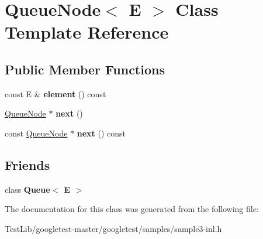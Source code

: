 \hypertarget{classQueueNode}{}\section{Queue\+Node$<$ E $>$ Class Template Reference}
\label{classQueueNode}
\subsection*{Public Member Functions}
\begin{DoxyCompactItemize}
\item 
\mbox{\label{classQueueNode_a1c61b3ed32e089f5901b87022ef84985}} 
const E \& {\bfseries element} () const
\item 
\mbox{\label{classQueueNode_a8a9fdf488da06533360999ef85db56ea}} 
\hyperlink{classQueueNode}{Queue\+Node} $\ast$ {\bfseries next} ()
\item 
\mbox{\label{classQueueNode_ada477e4f309f29383112dbda473dd985}} 
const \hyperlink{classQueueNode}{Queue\+Node} $\ast$ {\bfseries next} () const
\end{DoxyCompactItemize}
\subsection*{Friends}
\begin{DoxyCompactItemize}
\item 
\mbox{\label{classQueueNode_ad4336229b1d7c3626e4ba69f236b202d}} 
class {\bfseries Queue$<$ E $>$}
\end{DoxyCompactItemize}


The documentation for this class was generated from the following file\+:\begin{DoxyCompactItemize}
\item 
Test\+Lib/googletest-\/master/googletest/samples/sample3-\/inl.\+h\end{DoxyCompactItemize}
